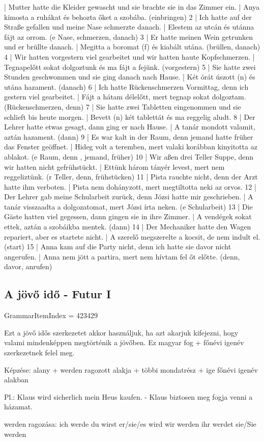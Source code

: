 \documentclass{article}
\newenvironment{desc}{\verbatim}{\endverbatim}
\newenvironment{exmp}{\verbatim}{\endverbatim}
\begin{document}
\begin{exmp}
1 | Mutter hatte die Kleider gewascht und sie brachte sie in das Zimmer ein. | Anya kimosta a ruhákat és behozta őket a szobába. (einbringen)
2 | Ich hatte auf der Straße gefallen und meine Nase schmerzte danach. | Elestem az utcán és utánna fájt az orrom. (e Nase, schmerzen, danach)
3 | Er hatte meinen Wein getrunken und er brüllte danach. | Megitta a boromat (f) és kiabált utána. (brüllen, danach)
4 | Wir hatten vorgestern viel gearbeitet und wir hatten haute Kopfschmerzen. | Tegnapelőtt sokat dolgoztunk és ma fájt a fejünk. (vorgestern)
5 | Sie hatte zwei Stunden geschwommen und sie ging danach nach Hause. | Két órát úszott (n) és utána hazament. (danach)
6 | Ich hatte Rückenschmerzen Vormittag, denn ich gestern viel gearbeitet. | Fájt a hátam délelőtt, mert tegnap sokat dolgoztam. (Rückenschmerzen, denn)
7 | Sie hatte zwei Tabletten eingenommen und sie schlieft bis heute morgen. | Bevett (n) két tablettát és ma reggelig aludt.
8 | Der Lehrer hatte etwas gesagt, dann ging er nach Hause. | A tanár mondott valamit, aztán hazament. (dann)
9 | Es war kalt in der Raum, denn jemand hatte früher das Fenster geöffnet. | Hideg volt a teremben, mert valaki korábban kinyitotta az ablakot. (e Raum, denn , jemand, früher)
10 | Wir aßen drei Teller Suppe, denn wir hatten nicht gefrühstückt. | Ettünk három tányér levest, mert nem reggeliztünk. (r Teller, denn, frühstücken)
11 | Pista rauchte nicht, denn der Arzt hatte ihm verboten. | Pista nem dohányzott, mert megtiltotta neki az orvos.
12 | Der Lehrer gab meine Schularbeit zurück, denn Józsi hatte mir geschrieben. | A tanár visszaadta a dolgozatomat, mert Józsi írta neken. (e Schularbeit)
13 | Die Gäste hatten viel gegessen, dann gingen sie in ihre Zimmer. | A vendégek sokat ettek, aztán a szobáikba mentek. (dann)
14 | Der Mechaniker hatte den Wagen repariert, aber es startete nicht. | A szerelő megszerelte a kocsit, de nem indult el. (start)
15 | Anna kam auf die Party nicht, denn ich hatte sie davor nicht angerufen. | Anna nem jött a partira, mert nem hívtam fel őt előtte. (denn, davor, anrufen)
\end{exmp}

\subsection{A jövő idő - Futur I}

GrammarItemIndex = 423429

\begin{desc}
Ezt a jövő idős szerkezetet akkor használjuk, ha azt akarjuk kifejezni, hogy valami mindenképpen megtörténik a jövőben. Ez magyar fog + főnévi igenév szerkezetnek felel meg.

Képzése: alany + werden ragozott alakja + többi mondatrész + ige főnévi igenév alakban

Pl.: Klaus wird sicherlich mein Heus kaufen. - Klaus biztosen meg fogja venni a házamat.

werden ragozása:
ich werde
du wirst
er/sie/es wird
wir werden
ihr werdet
sie/Sie werden
\end{desc}
\end{document}
